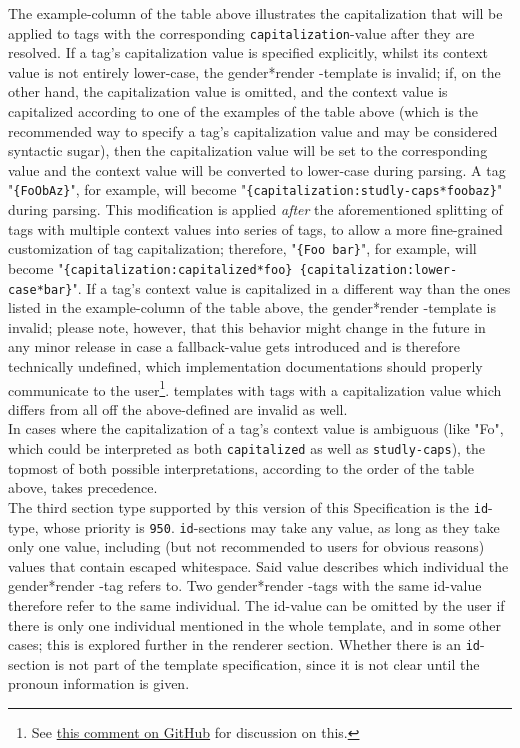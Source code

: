 \documentclass{article}
\newcommand{\GenderRender}{
    gender*render
}
\begin{document}
    The example-column of the table above illustrates the capitalization that will be applied to tags with the corresponding \texttt{capitalization}-value after they are resolved.
    If a tag's capitalization value is specified explicitly, whilst its context value is not entirely lower-case, the \GenderRender-template is invalid;
    if, on the other hand, the capitalization value is omitted, and the context value is capitalized according to one of the examples of the table above (which is the recommended way to specify a tag's capitalization value and may be considered syntactic sugar), then the capitalization value will be set to the corresponding value and the context value will be converted to lower-case during parsing.
    A tag "\texttt{\{FoObAz\}}", for example, will become "\texttt{\{capitalization:studly-caps*foobaz\}}" during parsing.
    This modification is applied \emph{after} the aforementioned splitting of tags with multiple context values into series of tags, to allow a more fine-grained customization of tag capitalization;
    therefore, "\texttt{\{Foo bar\}}", for example, will become "\texttt{\{capitalization:capitalized*foo\} \{capitalization:lower-case*bar\}}".
    If a tag's context value is capitalized in a different way than the ones listed in the example-column of the table above, the \GenderRender-template is invalid;
    please note, however, that this behavior might change in the future in any minor release in case a fallback-value gets introduced and is therefore technically undefined, which implementation documentations should properly communicate to the user\footnote{See \href{https://github.com/phseiff/gender-render/issues/2\#issuecomment-798799367}{this comment on GitHub} for discussion on this.}.
    templates with tags with a capitalization value which differs from all off the above-defined are invalid as well.\\
    In cases where the capitalization of a tag's context value is ambiguous (like "Fo", which could be interpreted as both \texttt{capitalized} as well as \texttt{studly-caps}), the topmost of both possible interpretations, according to the order of the table above, takes precedence.\\

    The third section type supported by this version of this Specification is the \texttt{id}-type, whose priority is \texttt{950}.
    \texttt{id}-sections may take any value, as long as they take only one value, including (but not recommended to users for obvious reasons) values that contain escaped whitespace.
    Said value describes which individual the \GenderRender-tag refers to.
    Two \GenderRender-tags with the same id-value therefore refer to the same individual.
    The id-value can be omitted by the user if there is only one individual mentioned in the whole template, and in some other cases;
    this is explored further in the renderer section.
    Whether there is an \texttt{id}-section is not part of the template specification, since it is not clear until the pronoun information is given.\\
\end{document}
